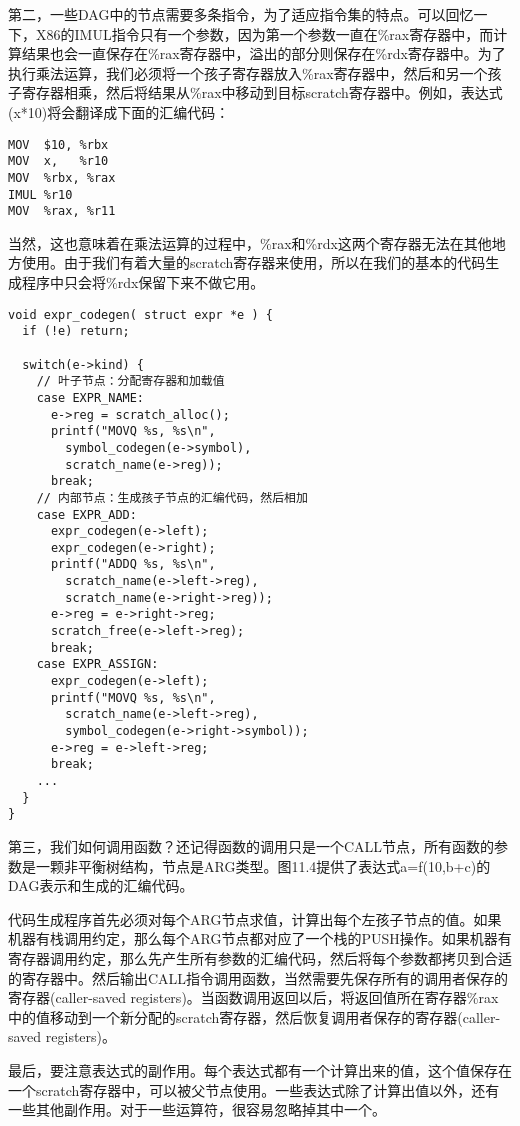 \documentclass[cn,11pt,chinese]{elegantbook}
\begin{document}
第二，一些DAG中的节点需要多条指令，为了适应指令集的特点。可以回忆一下，X86的IMUL指令只有一个参数，因为第一个参数一直在\%rax寄存器中，而计算结果也会一直保存在\%rax寄存器中，溢出的部分则保存在\%rdx寄存器中。为了执行乘法运算，我们必须将一个孩子寄存器放入\%rax寄存器中，然后和另一个孩子寄存器相乘，然后将结果从\%rax中移动到目标scratch寄存器中。例如，表达式(x*10)将会翻译成下面的汇编代码：

\begin{verbatim}
MOV  $10, %rbx
MOV  x,   %r10
MOV  %rbx, %rax
IMUL %r10
MOV  %rax, %r11
\end{verbatim}

当然，这也意味着在乘法运算的过程中，\%rax和\%rdx这两个寄存器无法在其他地方使用。由于我们有着大量的scratch寄存器来使用，所以在我们的基本的代码生成程序中只会将\%rdx保留下来不做它用。

\begin{verbatim}
void expr_codegen( struct expr *e ) {
  if (!e) return;
  
  switch(e->kind) {
    // 叶子节点：分配寄存器和加载值
    case EXPR_NAME:
      e->reg = scratch_alloc();
      printf("MOVQ %s, %s\n",
        symbol_codegen(e->symbol),
        scratch_name(e->reg));
      break;
    // 内部节点：生成孩子节点的汇编代码，然后相加
    case EXPR_ADD:
      expr_codegen(e->left);
      expr_codegen(e->right);
      printf("ADDQ %s, %s\n",
        scratch_name(e->left->reg),
        scratch_name(e->right->reg));
      e->reg = e->right->reg;
      scratch_free(e->left->reg);
      break;
    case EXPR_ASSIGN:
      expr_codegen(e->left);
      printf("MOVQ %s, %s\n",
        scratch_name(e->left->reg),
        symbol_codegen(e->right->symbol));
      e->reg = e->left->reg;
      break;
    ...
  }
}
\end{verbatim}

第三，我们如何调用函数？还记得函数的调用只是一个CALL节点，所有函数的参数是一颗非平衡树结构，节点是ARG类型。图11.4提供了表达式a=f(10,b+c)的DAG表示和生成的汇编代码。

代码生成程序首先必须对每个ARG节点求值，计算出每个左孩子节点的值。如果机器有栈调用约定，那么每个ARG节点都对应了一个栈的PUSH操作。如果机器有寄存器调用约定，那么先产生所有参数的汇编代码，然后将每个参数都拷贝到合适的寄存器中。然后输出CALL指令调用函数，当然需要先保存所有的调用者保存的寄存器(caller-saved registers)。当函数调用返回以后，将返回值所在寄存器\%rax中的值移动到一个新分配的scratch寄存器，然后恢复调用者保存的寄存器(caller-saved registers)。

最后，要注意表达式的副作用。每个表达式都有一个计算出来的值，这个值保存在一个scratch寄存器中，可以被父节点使用。一些表达式除了计算出值以外，还有一些其他副作用。对于一些运算符，很容易忽略掉其中一个。
\end{document}

